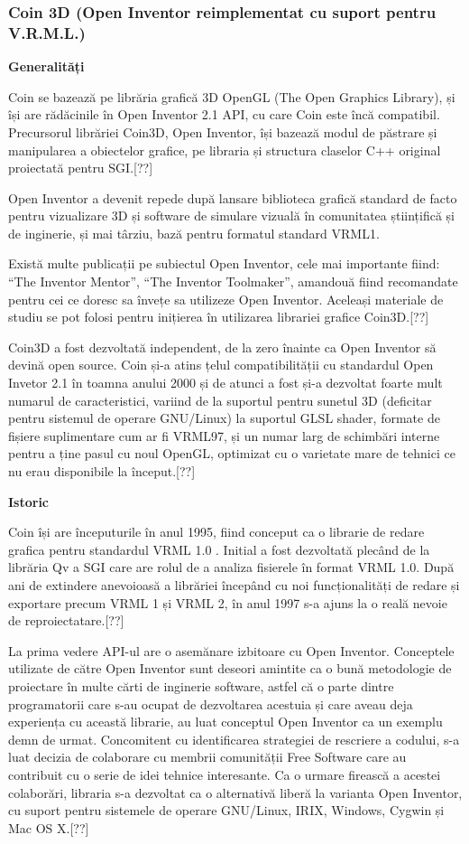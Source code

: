 \subsubsection{Coin 3D (Open Inventor reimplementat cu suport pentru V.R.M.L.)}
\par \textbf{Generalități}
\par Coin se bazează pe librăria grafică 3D OpenGL (The Open Graphics Library), și își are rădăcinile în Open Inventor 2.1 API, cu care Coin este încă compatibil. Precursorul librăriei Coin3D, Open Inventor, își bazează modul de păstrare și manipularea a obiectelor grafice, pe libraria și structura claselor C++ original proiectată pentru SGI.[??]
\par Open Inventor a devenit repede după lansare biblioteca grafică standard de facto pentru vizualizare 3D și software de simulare vizuală în comunitatea științifică și de inginerie, și mai târziu, bază pentru formatul standard VRML1. 
\par Există multe publicații pe subiectul Open Inventor, cele mai importante fiind: “The Inventor Mentor”, “The Inventor Toolmaker”, amandouă fiind recomandate pentru cei ce doresc sa învețe sa utilizeze Open Inventor. Aceleași materiale de studiu se pot folosi pentru inițierea în utilizarea librariei grafice Coin3D.[??]
\par Coin3D a fost dezvoltată independent, de la zero înainte ca Open Inventor să devină open source. Coin și-a atins țelul compatibilității cu standardul Open Invetor 2.1 în toamna anului 2000 și de atunci a fost și-a dezvoltat foarte mult numarul de caracteristici, variind de la suportul pentru sunetul 3D (deficitar pentru sistemul de operare GNU/Linux) la suportul GLSL shader, formate de fișiere suplimentare cum ar fi VRML97, și un numar larg de schimbări interne pentru a ține pasul cu noul OpenGL, optimizat cu o varietate mare de tehnici ce nu erau disponibile la început.[??] 
\par \textbf{Istoric}
\par Coin își are începuturile în anul 1995, fiind conceput ca o librarie de redare grafica pentru standardul VRML 1.0 . Initial a fost dezvoltată plecând de la librăria Qv a SGI care are rolul de a analiza fisierele în format VRML 1.0. După ani de extindere anevoioasă a librăriei începând cu noi funcționalități de redare și exportare precum VRML 1 și VRML 2, în anul 1997 s-a ajuns la o reală nevoie de reproiectatare.[??]
\par La prima vedere API-ul are o asemănare izbitoare cu Open Inventor. Conceptele utilizate de către Open Inventor sunt deseori amintite ca o bună metodologie de proiectare în multe cărti de inginerie software, astfel că o parte dintre programatorii care s-au ocupat de dezvoltarea acestuia și care aveau deja experiența cu această librarie, au luat conceptul Open Inventor ca un exemplu demn de urmat. Concomitent cu identificarea strategiei de rescriere a codului, s-a luat decizia de colaborare cu membrii comunității Free Software care au contribuit cu o serie de idei tehnice interesante. Ca o urmare firească a acestei colaborări, libraria s-a dezvoltat ca o alternativă liberă la varianta Open Inventor, cu suport pentru sistemele de operare GNU/Linux, IRIX, Windows, Cygwin și Mac OS X.[??]


